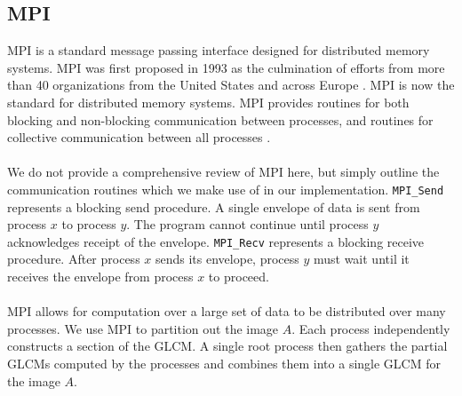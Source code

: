 \documentclass{article}
\begin{document}
\subsection{MPI}
   MPI is a standard message passing interface
   designed for distributed memory systems. MPI was first proposed in 1993 as the culmination of efforts from more than 40 organizations from  the United States and across Europe \cite{mpi1}. MPI is now the standard for distributed memory systems. MPI provides routines for both blocking and non-blocking communication between processes, and routines for collective communication between all processes \cite{mpi}. \\ \\ 
   We do not provide a comprehensive review of MPI here, but simply outline the communication routines which we make use of in our implementation. \texttt{MPI\_Send} represents a blocking send procedure. A single envelope of data is sent from process $x$ to process $y$. The program cannot continue until process $y$ acknowledges receipt of the envelope. \texttt{MPI\_Recv} represents a blocking receive procedure. After process $x$ sends its envelope, process $y$ must wait until it receives the envelope from process $x$ to proceed.  \\ \\ 
   MPI allows for computation over a large set of data to be distributed over many processes. We use MPI to partition out the image $A$. Each process independently constructs a section of the GLCM. A single root process then gathers the partial GLCMs computed by the processes and combines them into a single GLCM for the image $A$. 
\end{document}
